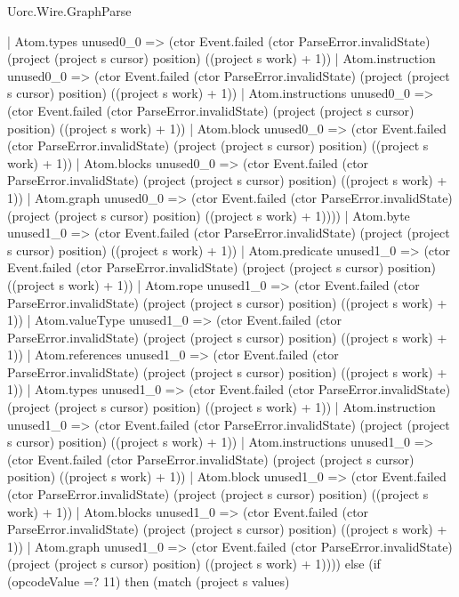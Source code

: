 \begin{lexlean}{Uorc.Wire.GraphParse}
\begin{semanticmodule}
{              | Atom.types unused0_0 => (ctor Event.failed (ctor ParseError.invalidState) (project (project s cursor) position) ((project s work) + 1))
              | Atom.instruction unused0_0 => (ctor Event.failed (ctor ParseError.invalidState) (project (project s cursor) position) ((project s work) + 1))
              | Atom.instructions unused0_0 => (ctor Event.failed (ctor ParseError.invalidState) (project (project s cursor) position) ((project s work) + 1))
              | Atom.block unused0_0 => (ctor Event.failed (ctor ParseError.invalidState) (project (project s cursor) position) ((project s work) + 1))
              | Atom.blocks unused0_0 => (ctor Event.failed (ctor ParseError.invalidState) (project (project s cursor) position) ((project s work) + 1))
              | Atom.graph unused0_0 => (ctor Event.failed (ctor ParseError.invalidState) (project (project s cursor) position) ((project s work) + 1))))
          | Atom.byte unused1_0 => (ctor Event.failed (ctor ParseError.invalidState) (project (project s cursor) position) ((project s work) + 1))
          | Atom.predicate unused1_0 => (ctor Event.failed (ctor ParseError.invalidState) (project (project s cursor) position) ((project s work) + 1))
          | Atom.rope unused1_0 => (ctor Event.failed (ctor ParseError.invalidState) (project (project s cursor) position) ((project s work) + 1))
          | Atom.valueType unused1_0 => (ctor Event.failed (ctor ParseError.invalidState) (project (project s cursor) position) ((project s work) + 1))
          | Atom.references unused1_0 => (ctor Event.failed (ctor ParseError.invalidState) (project (project s cursor) position) ((project s work) + 1))
          | Atom.types unused1_0 => (ctor Event.failed (ctor ParseError.invalidState) (project (project s cursor) position) ((project s work) + 1))
          | Atom.instruction unused1_0 => (ctor Event.failed (ctor ParseError.invalidState) (project (project s cursor) position) ((project s work) + 1))
          | Atom.instructions unused1_0 => (ctor Event.failed (ctor ParseError.invalidState) (project (project s cursor) position) ((project s work) + 1))
          | Atom.block unused1_0 => (ctor Event.failed (ctor ParseError.invalidState) (project (project s cursor) position) ((project s work) + 1))
          | Atom.blocks unused1_0 => (ctor Event.failed (ctor ParseError.invalidState) (project (project s cursor) position) ((project s work) + 1))
          | Atom.graph unused1_0 => (ctor Event.failed (ctor ParseError.invalidState) (project (project s cursor) position) ((project s work) + 1)))) else (if (opcodeValue =? 11) then (match (project s values)
}
\end{semanticmodule}
\end{lexlean}
